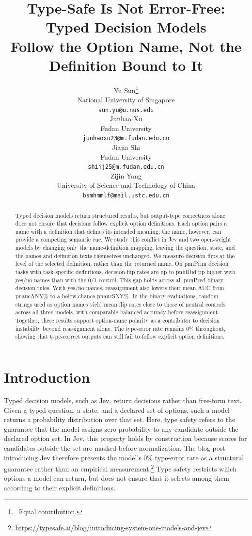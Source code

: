 \documentclass[11pt]{article}
\title{Type-Safe Is Not Error-Free: Typed Decision Models\\Follow the Option Name, Not the Definition Bound to It}
\author{
  Yu Sun\thanks{\ Equal contribution.} \\
  National University of Singapore \\
  \texttt{sun.yu@u.nus.edu} \\\And
  Junhao Xu\footnotemark[1] \\
  Fudan University \\
  \texttt{junhaoxu23@m.fudan.edu.cn} \\\AND
  Jiajia Shi \\
  Fudan University \\
  \texttt{shijj25@m.fudan.edu.cn} \\\And
  Zijin Yang \\
  University of Science and Technology of China \\
  \texttt{bsmhmmlf@mail.ustc.edu.cn} \\
}
\date{}
\newcommand{\m}[1]{\csname pn#1\endcsname}       %
\begin{document}
\maketitle

\begin{abstract}
Typed decision models return structured results, but output-type correctness alone does not ensure that decisions follow explicit option definitions.
%
Each option pairs a name with a definition that defines its intended meaning; the name, however, can provide a competing semantic cue.
%
We study this conflict in Jev and two open-weight models by changing only the name-definition mapping, leaving the question, state, and the names and definition texts themselves unchanged.
%
We measure decision flips at the level of the selected definition, rather than the returned name.
%
On \m{nPrim} decision tasks with task-specific definitions, decision-flip rates are up to \m{hlDid} pp higher with yes/no names than with the 0/1 control.
%
This gap holds across all \m{nPred} binary decision rules.
%
With yes/no names, reassignment also lowers their mean AUC from \m{aucANY}\% to a below-chance \m{aucSNY}\%.
%
In the binary evaluations, random strings used as option names yield mean flip rates close to those of neutral controls across all three models, with comparable balanced accuracy before reassignment.
%
Together, these results support option-name polarity as a contributor to decision instability beyond reassignment alone.
%
The type-error rate remains 0\% throughout, showing that type-correct outputs can still fail to follow explicit option definitions.
\end{abstract}


\section{Introduction}
Typed decision models, such as Jev, return decisions rather than free-form text.
Given a typed question, a state, and a declared set of options, such a model returns a probability distribution over that set.
%
Here, type safety refers to the guarantee that the model assigns zero probability to any candidate outside the declared option set. In Jev, this property holds by construction because scores for candidates outside the set are masked before normalization.
%
The blog post introducing Jev therefore presents the model's 0\% type-error rate
as a structural guarantee rather than an empirical measurement.\footnote{
\url{https://typesafe.ai/blog/introducing-system-one-models-and-jev}}
Type safety restricts which options a model can return, but does not ensure that it selects among them according to their explicit definitions.
\end{document}
